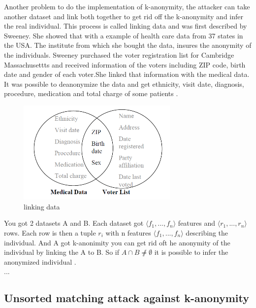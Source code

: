 \documentclass{llncs}
\begin{document}
Another problem to do the implementation of k-anonymity, the attacker can take another dataset and link both together to get rid off the k-anonymity and infer the real individual. This process is called linking data and was first described by Sweeney\cite{sweeney2002k}. She showed that with a example of health care data from 37 states in the USA. The institute from which she bought the data, insures the anonymity of the individuals. Sweeney purchased the voter registration list for Cambridge Massachusettts and received information of the voters including ZIP code, birth date and gender of each voter.She linked that information with the medical data. It was possible to deanonymize the data  and get ethnicity, visit date, diagnosis, procedure, medication and total charge of some patients \cite{sweeney2002k}. 
\\
\begin{figure}[]
	\centering
	\includegraphics[width=0.7\textwidth]{linkingdata.png}
	\caption{linking data}%
\end{figure}

You got 2 datasets A and B. Each dataset got \ensuremath{\langle f_1, ... ,f_n \rangle} features and \ensuremath{\langle r_1, ... ,r_n \rangle} rows.
Each row is then a tuple \ensuremath{r_i} with n features \ensuremath{\langle f_1, ... ,f_n \rangle} describing the individual.
And A got k-anonimity you can get rid oft he anonymity of the individual by linking the A to B. So if \ensuremath{A \cap B \not \neq \emptyset} it is possible to infer the anonymized individual \cite{sweeney2002k}.
\\ ...
\subsection{Unsorted matching attack against k-anonymity}
\end{document}

